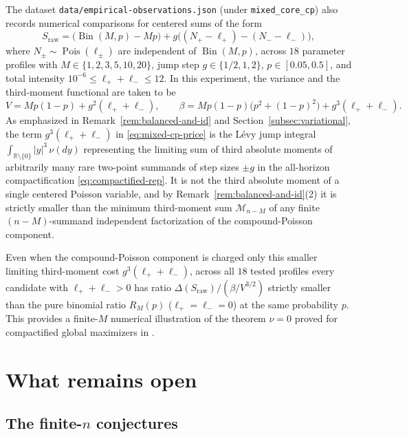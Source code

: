 \documentclass[11pt]{article}
\numberwithin{equation}{section}
\theoremstyle{definition}
\theoremstyle{remark}
\DeclareMathOperator{\Bin}{Bin}
\DeclareMathOperator{\Pois}{Pois}
\newcommand{\R}{\mathbb R}
\begin{document}
The dataset \texttt{data/\allowbreak empirical-observations.json} (under
\texttt{mixed\_core\_cp}) also records numerical comparisons for centered sums
of the form
\begin{equation}\label{eq:mixed-cp-law}
 S_{\mathrm{raw}}=\bigl(\Bin(M,p)-Mp\bigr)+g\bigl((N_+-\ell_+)-(N_--\ell_-)\bigr),
\end{equation}
where $N_\pm\sim\Pois(\ell_\pm)$ are independent of $\Bin(M,p)$, across $18$
parameter profiles with $M\in\{1,2,3,5,10,20\}$, jump step $g\in\{1/2,1,2\}$,
$p\in[0.05,0.5]$, and total intensity $10^{-6}\le\ell_++\ell_-\le12$. In this
experiment, the variance and the third-moment functional are taken to be
\begin{equation}\label{eq:mixed-cp-price}
 V=Mp(1-p)+g^2(\ell_++\ell_-),\qquad
 \beta=Mp(1-p)\bigl(p^2+(1-p)^2\bigr)+g^3(\ell_++\ell_-).
\end{equation}
As emphasized in Remark~\ref{rem:balanced-and-id} and
Section~\ref{subsec:variational}, the term $g^3(\ell_++\ell_-)$ in
\eqref{eq:mixed-cp-price} is the L\'evy jump integral
$\int_{\R\setminus\{0\}}|y|^3\,\nu(dy)$ representing the limiting sum of third
absolute moments of arbitrarily many rare two-point summands of step sizes
$\pm g$ in the all-horizon compactification \eqref{eq:compactified-rep}. It is
not the third absolute moment of a single centered Poisson variable, and by
Remark~\ref{rem:balanced-and-id}(2) it is strictly smaller than the minimum
third-moment sum $\mathcal M_{n-M}$ of any finite $(n-M)$-summand independent
factorization of the compound-Poisson component.

Even when the compound-Poisson component is charged only this smaller limiting
third-moment cost $g^3(\ell_++\ell_-)$, across all $18$ tested profiles every
candidate with $\ell_++\ell_->0$ has ratio $\Delta(S_{\mathrm{raw}})/(\beta/V^{3/2})$
strictly smaller than the pure binomial ratio $R_M(p)$ ($\ell_+=\ell_-=0$) at
the same probability $p$. This provides a finite-$M$ numerical illustration of
the theorem $\nu=0$ proved for compactified global maximizers in
\citet[Theorem~1.1]{BellExtremizers2026}.

\section{What remains open}\label{sec:open}

\subsection{The finite-$n$ conjectures}\label{subsec:open-conjectures}
\end{document}
